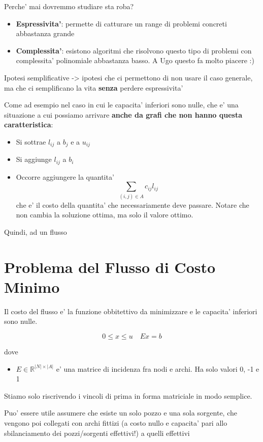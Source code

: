 Perche' mai dovremmo studiare sta roba?
\begin{itemize}
\item \textbf{Espressivita'}: permette di catturare un range di problemi concreti abbastanza grande
\item \textbf{Complessita'}: esistono algoritmi che risolvono questo tipo di problemi con complessita' polinomiale abbastanza basso. A Ugo questo fa molto piacere :)
\end{itemize}

Ipotesi semplificative -> ipotesi che ci permettono di non usare il caso generale, ma che ci semplificano la vita \textbf{senza} perdere espressivita'

Come ad esempio nel caso in cui le capacita' inferiori sono nulle, che e' una situazione a cui possiamo arrivare \textbf{anche da grafi che non hanno questa caratteristica}:

\begin{itemize}
\item Si sottrae $ l_{ij} $ a $ b_j $ e a $ u_{ij} $
\item Si aggiunge $ l_{ij} $ a $ b_i $
\item Occorre aggiungere la quantita'
  \[
    \sum_{(i,j) \in A} c_{ij}l_{ij}
  \]
  che e' il costo della quantita' che necessariamente deve passare. Notare che non cambia la soluzione ottima, ma solo il valore ottimo.
\end{itemize}

Quindi, ad un flusso 

\section{Problema del Flusso di Costo Minimo}

Il costo del flusso e' la funzione obbitettivo da minimizzare e le capacita' inferiori sono nulle. 

\[
0 \leq x \leq u \quad Ex = b
\]

dove

\begin{itemize}
  \item $ E \in \mathbb{R} ^{|N| \times |A|} $ e' una matrice di incidenza fra nodi e archi. Ha solo valori 0, -1 e 1
\end{itemize}

Stiamo solo riscrivendo i vincoli di prima in forma matriciale in modo semplice.

Puo' essere utile assumere che esiste un solo pozzo e una sola sorgente, che vengono poi collegati con archi fittizi (a costo nullo e capacita' pari allo sbilanciamento dei pozzi/sorgenti effettivi!) a quelli effettivi

